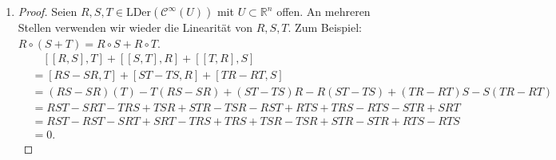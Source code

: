 \documentclass[a4paper]{article}
\theoremstyle{plain}
\begin{document}
\begin{enumerate}[label=(\roman*)]
	\item \begin{proof}Seien $R,S,T \in \mathrm{LDer}(\mathcal C^{\infty}(U))$ mit $U \subset \mathbb R^n$ offen. An mehreren Stellen verwenden wir wieder die Linearität von $R,S,T$. Zum Beispiel: $R \circ (S + T) = R \circ S + R \circ T$.
	\begin{align*}
		 & \quad [[R,S], T] + [[S,T], R] + [[T,R], S] \\
		&= [RS-SR, T] + [ST - TS, R] + [TR - RT, S] \\
		&= (RS-SR)(T) - T(RS-SR) + (ST-TS)R - R(ST-TS) + (TR-RT)S - S(TR-RT) \\
		&= RST - SRT - TRS + TSR + STR - TSR - RST + RTS + TRS - RTS - STR + SRT \\
		&= RST - RST - SRT + SRT - TRS + TRS + TSR - TSR + STR - STR + RTS - RTS \\
		&= 0.
	\end{align*}
	\end{proof}
\end{enumerate}
	
	
\end{document}
